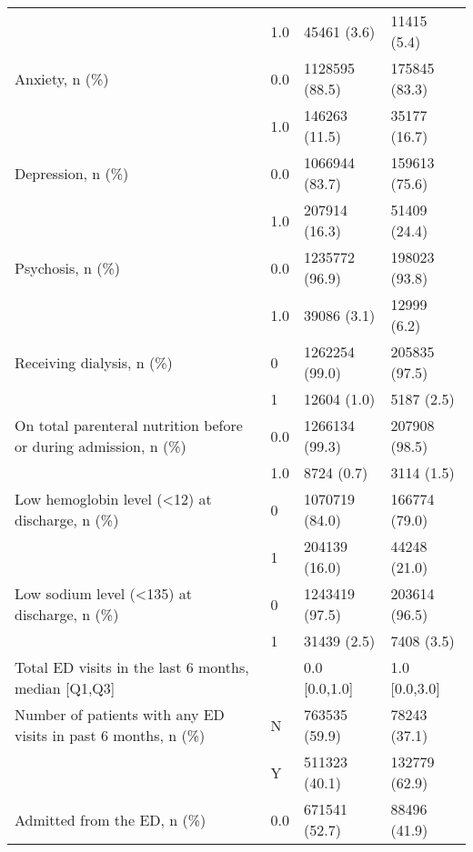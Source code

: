 \begin{tabular}{llll}
                                       & 1.0 &                    45461 (3.6) &        11415 (5.4) \\
Anxiety, n (\%) & 0.0 &                 1128595 (88.5) &      175845 (83.3) \\
                                       & 1.0 &                  146263 (11.5) &       35177 (16.7) \\
Depression, n (\%) & 0.0 &                 1066944 (83.7) &      159613 (75.6) \\
                                       & 1.0 &                  207914 (16.3) &       51409 (24.4) \\
Psychosis, n (\%) & 0.0 &                 1235772 (96.9) &      198023 (93.8) \\
                                       & 1.0 &                    39086 (3.1) &        12999 (6.2) \\
Receiving dialysis, n (\%) & 0 &                 1262254 (99.0) &      205835 (97.5) \\
                                       & 1 &                    12604 (1.0) &         5187 (2.5) \\
On total parenteral nutrition before or during admission, n (\%) & 0.0 &                 1266134 (99.3) &      207908 (98.5) \\
                                       & 1.0 &                     8724 (0.7) &         3114 (1.5) \\
Low hemoglobin level (<12) at discharge, n (\%) & 0 &                 1070719 (84.0) &      166774 (79.0) \\
                                       & 1 &                  204139 (16.0) &       44248 (21.0) \\
Low sodium level (<135) at discharge, n (\%) & 0 &                 1243419 (97.5) &      203614 (96.5) \\
                                       & 1 &                    31439 (2.5) &         7408 (3.5) \\
Total ED visits in the last 6 months, median [Q1,Q3] &   &                  0.0 [0.0,1.0] &      1.0 [0.0,3.0] \\
Number of patients with any ED visits in past 6 months, n (\%) & N &                  763535 (59.9) &       78243 (37.1) \\
                                       & Y &                  511323 (40.1) &      132779 (62.9) \\
Admitted from the ED, n (\%) & 0.0 &                  671541 (52.7) &       88496 (41.9) \\

\end{tabular}
